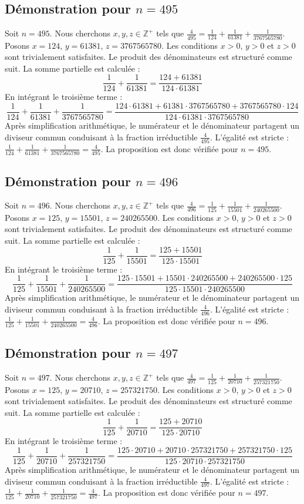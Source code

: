\documentclass[11pt,a4paper]{article}
\begin{document}
\subsection{Démonstration pour $n = 495$}
Soit $n = 495$. Nous cherchons $x, y, z \in \mathbb{Z}^{+}$ tels que $\frac{4}{495} = \frac{1}{124} + \frac{1}{61381} + \frac{1}{3767565780}$.
Posons $x = 124$, $y = 61381$, $z = 3767565780$.
Les conditions $x > 0$, $y > 0$ et $z > 0$ sont trivialement satisfaites.
Le produit des dénominateurs est structuré comme suit. La somme partielle est calculée :
$$ \frac{1}{124} + \frac{1}{61381} = \frac{124+61381}{124 \cdot 61381} $$
En intégrant le troisième terme :
$$ \frac{1}{124} + \frac{1}{61381} + \frac{1}{3767565780} = \frac{124 \cdot 61381 + 61381 \cdot 3767565780 + 3767565780 \cdot 124}{124 \cdot 61381 \cdot 3767565780} $$
Après simplification arithmétique, le numérateur et le dénominateur partagent un diviseur commun conduisant à la fraction irréductible $\frac{4}{495}$.
L'égalité est stricte : $\frac{1}{124} + \frac{1}{61381} + \frac{1}{3767565780} = \frac{4}{495}$.
La proposition est donc vérifiée pour $n = 495$.
\subsection{Démonstration pour $n = 496$}
Soit $n = 496$. Nous cherchons $x, y, z \in \mathbb{Z}^{+}$ tels que $\frac{4}{496} = \frac{1}{125} + \frac{1}{15501} + \frac{1}{240265500}$.
Posons $x = 125$, $y = 15501$, $z = 240265500$.
Les conditions $x > 0$, $y > 0$ et $z > 0$ sont trivialement satisfaites.
Le produit des dénominateurs est structuré comme suit. La somme partielle est calculée :
$$ \frac{1}{125} + \frac{1}{15501} = \frac{125+15501}{125 \cdot 15501} $$
En intégrant le troisième terme :
$$ \frac{1}{125} + \frac{1}{15501} + \frac{1}{240265500} = \frac{125 \cdot 15501 + 15501 \cdot 240265500 + 240265500 \cdot 125}{125 \cdot 15501 \cdot 240265500} $$
Après simplification arithmétique, le numérateur et le dénominateur partagent un diviseur commun conduisant à la fraction irréductible $\frac{4}{496}$.
L'égalité est stricte : $\frac{1}{125} + \frac{1}{15501} + \frac{1}{240265500} = \frac{4}{496}$.
La proposition est donc vérifiée pour $n = 496$.
\subsection{Démonstration pour $n = 497$}
Soit $n = 497$. Nous cherchons $x, y, z \in \mathbb{Z}^{+}$ tels que $\frac{4}{497} = \frac{1}{125} + \frac{1}{20710} + \frac{1}{257321750}$.
Posons $x = 125$, $y = 20710$, $z = 257321750$.
Les conditions $x > 0$, $y > 0$ et $z > 0$ sont trivialement satisfaites.
Le produit des dénominateurs est structuré comme suit. La somme partielle est calculée :
$$ \frac{1}{125} + \frac{1}{20710} = \frac{125+20710}{125 \cdot 20710} $$
En intégrant le troisième terme :
$$ \frac{1}{125} + \frac{1}{20710} + \frac{1}{257321750} = \frac{125 \cdot 20710 + 20710 \cdot 257321750 + 257321750 \cdot 125}{125 \cdot 20710 \cdot 257321750} $$
Après simplification arithmétique, le numérateur et le dénominateur partagent un diviseur commun conduisant à la fraction irréductible $\frac{4}{497}$.
L'égalité est stricte : $\frac{1}{125} + \frac{1}{20710} + \frac{1}{257321750} = \frac{4}{497}$.
La proposition est donc vérifiée pour $n = 497$.
\end{document}
